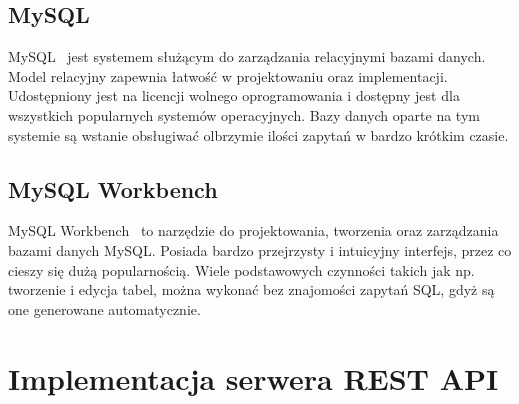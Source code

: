 \subsection{MySQL}
MySQL~\cite{SQL} jest systemem służącym do zarządzania relacyjnymi bazami danych. Model relacyjny zapewnia łatwość w projektowaniu oraz implementacji. Udostępniony jest na licencji wolnego oprogramowania i dostępny jest dla wszystkich popularnych systemów operacyjnych. Bazy danych oparte na tym systemie są wstanie obsługiwać olbrzymie ilości zapytań w bardzo krótkim czasie.
\subsection{MySQL Workbench}
MySQL Workbench~\cite{Workbench} to narzędzie do projektowania, tworzenia oraz zarządzania bazami danych MySQL. Posiada bardzo przejrzysty i intuicyjny interfejs, przez co cieszy się dużą popularnością. Wiele podstawowych czynności takich jak np. tworzenie i edycja tabel, można wykonać bez znajomości zapytań SQL, gdyż są one generowane automatycznie.

\section{Implementacja serwera REST API}

